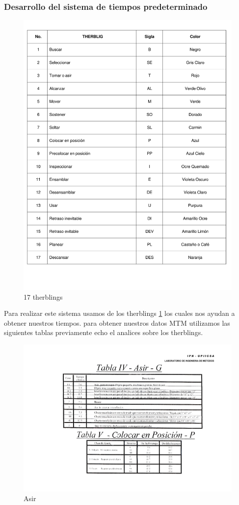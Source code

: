 \subsubsection{Desarrollo del sistema de tiempos predeterminado}
% 
\begin{figure}[H]
    \centering
    \includegraphics[scale=0.40]{13/img/tablaTherbling.pdf}
    \caption{17 therblings}
    \label{fig:therblings}
\end{figure}
Para realizar este sistema usamos de los therblings \ref{fig:therblings} los cuales nos ayudan a obtener nuestros tiempos.
para obtener nuestros datos MTM utilizamos las siguientes tablas previamente echo el analices sobre los therblings.
\begin{figure}[H]
    \centering
    \includegraphics[scale=0.4]{13/img/tablaAsir.pdf}
    \caption{Asir}
    \label{fig:Asir}
\end{figure}
